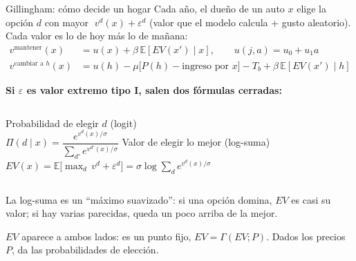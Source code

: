 \documentclass[aspectratio=169,11pt]{beamer}
\begin{document}
\begin{frame}{Gillingham: cómo decide un hogar}
  Cada año, el dueño de un auto $x$ elige la opción $d$ con mayor $\;v^d(x)+\varepsilon^d$
  (valor que el modelo calcula + gusto aleatorio). Cada valor es lo de hoy más lo de mañana:
  \vspace{-0.3em}
  \begin{align*}
    v^{\text{mantener}}(x) &= u(x) + \beta\, \mathbb E\!\left[EV(x')\mid x\right],
      \qquad u(j,a)=u_0+u_1a\\
    v^{\text{cambiar a }h}(x) &= u(h) - \mu\big[P(h) - \text{ingreso por }x\big] - T_b
          + \beta\, \mathbb E\!\left[EV(x')\mid h\right]
  \end{align*}
  \vspace{-1em}
  \begin{block}{}
    \textbf{Si $\varepsilon$ es valor extremo tipo I, salen dos fórmulas cerradas:}
    \begin{columns}[T]
      \centering
      Probabilidad de elegir $d$ (logit)\\[0.3em]
      $\Pi(d\mid x)=\dfrac{e^{v^d(x)/\sigma}}{\sum_{d'} e^{v^{d'}(x)/\sigma}}$
      \centering
      Valor de elegir lo mejor (log-suma)\\[0.3em]
      $EV(x)=\mathbb E\big[\max_d\, v^d+\varepsilon^d\big]=\sigma\log\sum_{d} e^{v^d(x)/\sigma}$
    \end{columns}
    \smallskip
    {\small La log-suma es un ``máximo suavizado'': si una opción domina, $EV$ es casi su
    valor; si hay varias parecidas, queda un poco arriba de la mejor.}
  \end{block}
  {\small $EV$ aparece a ambos lados: es un punto fijo, $EV=\Gamma(EV;P)$. Dados los precios
  $P$, da las probabilidades de elección.}
\end{frame}
\end{document}
